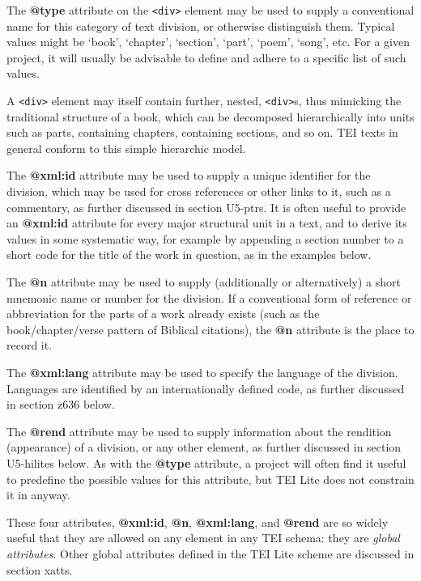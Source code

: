 \documentclass[11pt,twoside]{article}\makeatletter
\begin{document}
The \textbf{@type} attribute on the \texttt{<div>} element may be used to supply a conventional name for this category of text division, or otherwise distinguish them.  Typical values might be ‘book’, ‘chapter’, ‘section’, ‘part’, ‘poem’, ‘song’, etc.  For a given project, it will usually be advisable to define and adhere to a specific list of such values.  \par
A \texttt{<div>} element may itself contain further, nested, \texttt{<div>}s, thus mimicking the traditional structure of a book, which can be decomposed hierarchically into units such as parts, containing chapters, containing sections, and so on. TEI texts in general conform to this simple hierarchic model.\par
 The \textbf{@xml:id} attribute may be used to supply a unique identifier for the division, which may be used for cross references or other links to it, such as a commentary, as further discussed in section U5-ptrs. It is often useful to provide an \textbf{@xml:id} attribute for every major structural unit in a text, and to derive its values in some systematic way, for example by appending a section number to a short code for the title of the work in question, as in the examples below.\par
The \textbf{@n} attribute may be used to supply (additionally or alternatively) a short mnemonic name or number for the division.  If a conventional form of reference or abbreviation for the parts of a work already exists (such as the book/chapter/verse pattern of Biblical citations), the \textbf{@n} attribute is the place to record it.\par
The \textbf{@xml:lang} attribute may be used to specify the language of the division.  Languages are identified by an internationally defined code, as further discussed in section z636 below.\par
The \textbf{@rend} attribute may be used to supply information about the rendition (appearance) of a division, or any other element, as further discussed in section U5-hilites below. As with the \textbf{@type} attribute, a project will often find it useful to predefine the possible values for this attribute, but TEI Lite does not constrain it in anyway. \par
 These four attributes, \textbf{@xml:id}, \textbf{@n}, \textbf{@xml:lang}, and \textbf{@rend} are so widely useful that they are allowed on any element in any TEI schema: they are \emph{global attributes}.  Other global attributes defined in the TEI Lite scheme are discussed in section xatts.\par
\end{document}
